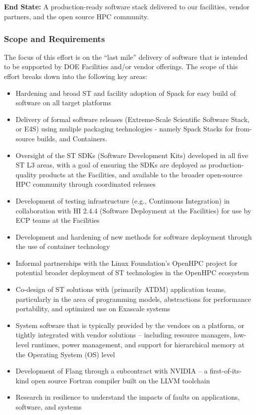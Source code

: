 \subsection{ \ecosystem}

\textbf{End State:} A production-ready software stack delivered to our facilities, vendor partners, and the open source HPC community.

\subsubsection{Scope and Requirements}
The focus of this effort is on the ``last mile'' delivery of software that is intended to be supported by DOE Facilities and/or vendor offerings. The scope of this effort breaks down into the following key areas:
\begin{itemize}
	\item Hardening and broad ST and facility adoption of Spack for easy build of software on all target platforms
        \item Delivery of formal software releases (Extreme-Scale Scientific Software Stack, or E4S) using muliple packaging technologies - namely Spack Stacks for from-source builds, and Containers.
	\item Oversight of the ST SDKs (Software Development Kits) developed in all five ST L3 areas, with a goal of ensuring the SDKs are deployed as production-quality products at the Facilities, and available to the broader open-source HPC community through coordinated releases
	\item Development of testing infrastructure (e.g., Continuous Integration) in collaboration with HI 2.4.4 (Software Deployment at the Facilities) for use by ECP teams at the Facilities
	\item Development and hardening of new methods for software deployment through the use of container technology
	\item Informal partnerships with the Linux Foundation's OpenHPC project for potential broader deployment of ST technologies in the OpenHPC ecosystem
	\item Co-design of ST solutions with (primarily ATDM) application teams, particularly in the area of programming models, abstractions for performance portability, and optimized use on Exascale systems
	\item System software that is typically provided by the vendors on a platform, or tightly integrated with vendor solutions – including resource managers, low-level runtimes, power management, and support for hierarchical memory at the Operating System (OS) level
	\item Development of Flang through a subcontract with NVIDIA – a first-of-its-kind open source Fortran compiler built on the LLVM toolchain
	\item Research in resilience to understand the impacts of faults on applications, software, and systems
\end{itemize}
